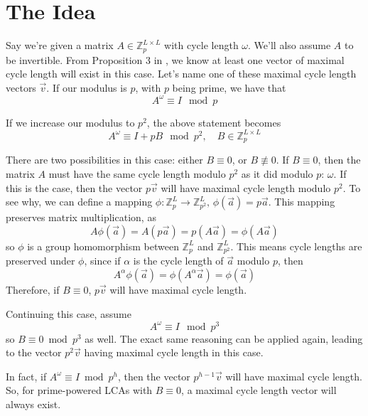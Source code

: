 \documentclass[a4paper, reqno, 12pt]{amsart}
\begin{document}
	\section{The Idea}
		Say we're given a matrix $A \in \mathds{Z}_{p}^{L \times L}$ with cycle length $\omega$. We'll also assume $A$ to be invertible. From Proposition 3 in \citet{Mendivil2012}, we know at least one
		vector of maximal cycle length will exist in this case. Let's name one of these maximal cycle length vectors $\vec{v}$. If our modulus is $p$, with $p$ being 
		prime, we have that
		\[
			A^{\omega} \equiv I \mod{p}
		\]
		
		If we increase our modulus to $p^2$, the above statement becomes
		\[
			A^{\omega} \equiv I + pB \mod{p^2}, \quad B \in \mathds{Z}_{p}^{L \times L}
		\]
		
		There are two possibilities in this case: either $B \equiv 0$, or $B \not\equiv 0$. If $B \equiv 0$, then the matrix $A$ must have the same cycle length
		modulo $p^{2}$ as it did modulo $p$: $\omega$. If this is the case, then the vector $p\vec{v}$ will have maximal cycle length modulo $p^{2}$. To see why,
		we can define a mapping $\phi : \mathds{Z}_{p}^{L} \rightarrow \mathds{Z}_{p^{2}}^{L}, \, \phi(\vec{a}) = p\vec{a}$. This mapping preserves matrix 
		multiplication, as
		\[
			A\phi(\vec{a}) = A(p\vec{a}) = p(A\vec{a}) = \phi(A\vec{a})
		\]
		so $\phi$ is a group homomorphism between $\mathds{Z}_{p}^{L}$ and $\mathds{Z}_{p^{2}}^{L}$. This means cycle lengths are preserved under $\phi$, since if
		$\alpha$ is the cycle length of $\vec{a}$ modulo $p$, then
		\[
			A^{\alpha}\phi(\vec{a}) = \phi(A^{\alpha}\vec{a}) = \phi(\vec{a})
		\]
		Therefore, if $B \equiv 0$, $p\vec{v}$ will have maximal cycle length.
		
		Continuing this case, assume
		\[
			A^{\omega} \equiv I \mod{p^3}
		\]
		so $B \equiv 0 \bmod{p^3}$ as well. The exact same reasoning can be applied again, leading to the vector ${p^2}\vec{v}$ having maximal cycle length in this
		case.
		
		In fact, if $A^{\omega} \equiv I \bmod{p^h}$, then the vector $p^{h-1}\vec{v}$ will have maximal cycle length. So, for prime-powered LCAs with $B \equiv 0$,
		a maximal cycle length vector will always exist.
		
\end{document}
